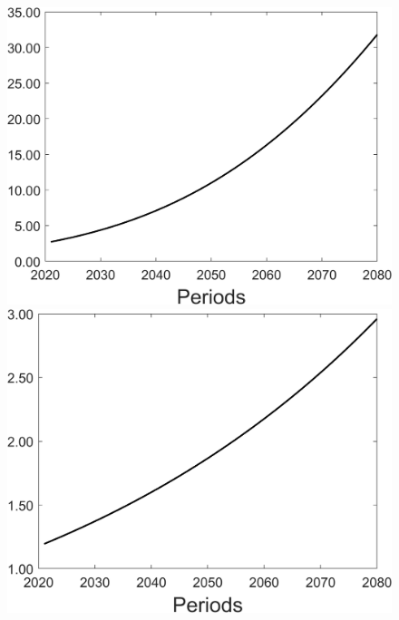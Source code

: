 \begin{figure}[h!!]
\begin{minipage}[]{0.32\textwidth}
	\end{minipage}
	\begin{minipage}[]{0.32\textwidth}
		\includegraphics[width=1\textwidth]{../../codding_model/Own/figures/Rep_agent/staticonlyRam_separate_xc_periods59_eppsilon0.40_zeta1.40_Ad08_Ac04_thetac0.70_thetad0.56_HetGrowth1_tauul0.181_util0_withtarget0_lgd0.png}
	\end{minipage}
	\begin{minipage}[]{0.32\textwidth}
		\includegraphics[width=1\textwidth]{../../codding_model/Own/figures/Rep_agent/staticonlyRam_separate_ydyc_periods59_eppsilon0.40_zeta1.40_Ad08_Ac04_thetac0.70_thetad0.56_HetGrowth1_tauul0.181_util0_withtarget0_lgd0.png}
	\end{minipage}
\end{figure}

